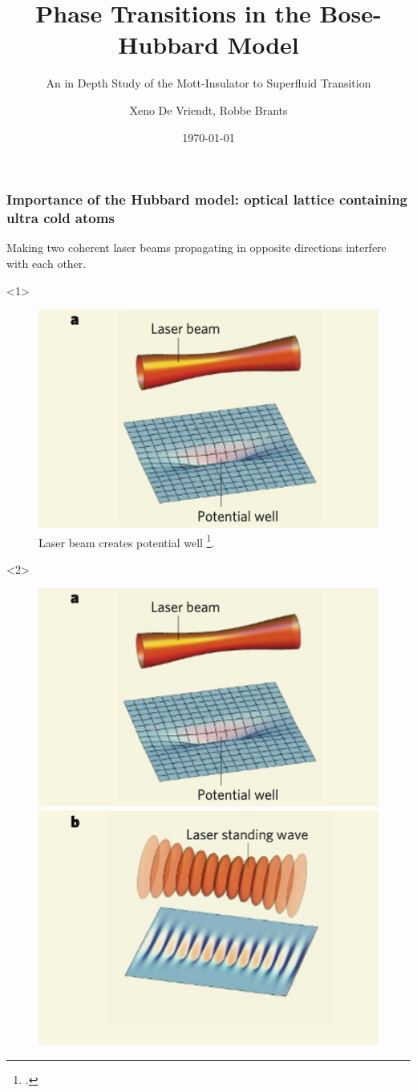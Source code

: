 \documentclass[aspectratio=169]{beamer}
\title{Phase Transitions in the Bose-Hubbard Model}
\subtitle{An in Depth Study of the Mott-Insulator to Superfluid Transition}
\author[DB]{Xeno De Vriendt, Robbe Brants}
\date{\today}
\begin{document}
\titleframe

\begin{frame}
  \frametitle{Importance of the Hubbard model: optical lattice containing ultra cold atoms}
  Making two coherent laser beams propagating in opposite directions interfere with each other.
    \begin{onlyenv}<1>
      \begin{figure}
        \includegraphics[scale=0.25]{../img/Optical-lattice-creation-a.png}
        \caption{Laser beam creates potential well \footcite{Greiner2008}.}
      \end{figure}
    \end{onlyenv}
    \begin{onlyenv}<2>
      \begin{figure}
        \includegraphics[scale=0.25]{../img/Optical-lattice-creation-a.png} \includegraphics[scale=0.25]{../img/Optical-lattice-creation-b.png}

\end{figure}
\end{onlyenv}
\end{frame}
\end{document}
